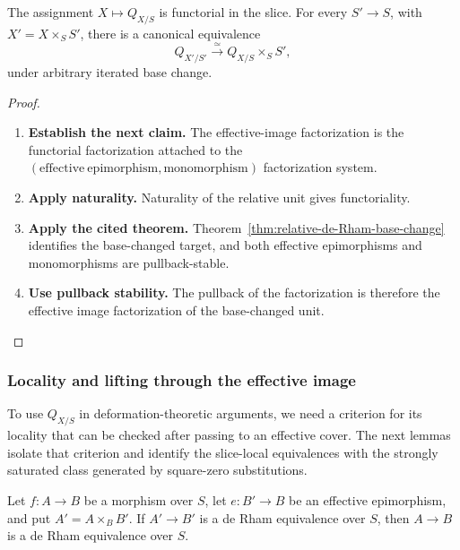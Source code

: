 \begin{proposition}
\label{prop:Q-base-change}
The assignment \(X\mapsto Q_{X/S}\) is functorial in the slice. For every
\(S'\to S\), with \(X'=X\times_SS'\), there is a canonical equivalence
\[
  Q_{X'/S'}\xrightarrow{\simeq}Q_{X/S}\times_SS',
\]
under arbitrary iterated base change.
\end{proposition}

\begin{proof}
\leavevmode
\begin{enumerate}[label=\textup{(\arabic*)}]
    \item \textbf{Establish the next claim.}
    The effective-image factorization is the functorial factorization attached to the
    \((\mathrm{effective\ epimorphism},\mathrm{monomorphism})\) factorization system.
    \item \textbf{Apply naturality.}
    Naturality of the
    relative unit gives functoriality.
    \item \textbf{Apply the cited theorem.}
    Theorem~\ref{thm:relative-de-Rham-base-change}
    identifies the base-changed target, and both effective epimorphisms and monomorphisms
    are pullback-stable.
    \item \textbf{Use pullback stability.}
    The pullback of the factorization is therefore the effective
    image factorization of the base-changed unit.
\end{enumerate}
\end{proof}

\subsubsection{Locality and lifting through the effective image}

To use \(Q_{X/S}\) in deformation-theoretic arguments, we need a criterion for
its locality that can be checked after passing to an effective cover. The
next lemmas isolate that criterion and identify the slice-local equivalences
with the strongly saturated class generated by square-zero substitutions.

\begin{lemma}
\label{lem:target-locality-de-Rham-equivalences}
Let \(f:A\to B\) be a morphism over \(S\), let \(e:B'\to B\) be an effective
epimorphism, and put \(A'=A\times_BB'\). If \(A'\to B'\) is a de Rham equivalence
over \(S\), then \(A\to B\) is a de Rham equivalence over \(S\).
\end{lemma}

